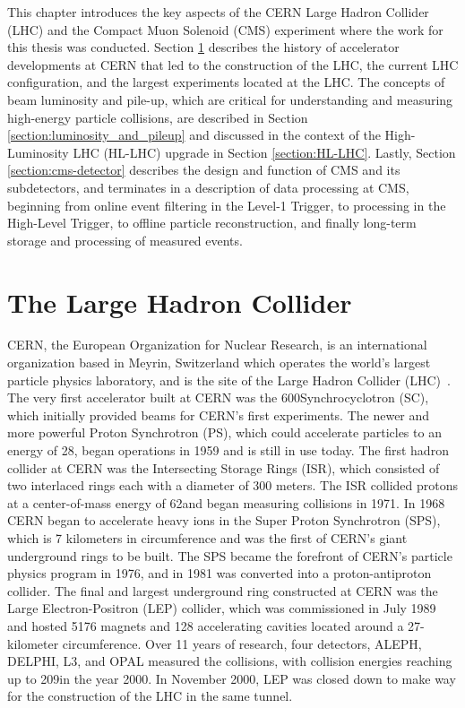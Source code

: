 This chapter introduces the key aspects of the CERN Large Hadron Collider (LHC) and the Compact Muon Solenoid (CMS) experiment where the work for this thesis was conducted. Section \ref{section:LHC} describes the history of accelerator developments at CERN that led to the construction of the LHC, the current LHC configuration, and the largest experiments located at the LHC. The concepts of beam luminosity and pile-up, which are critical for understanding and measuring high-energy particle collisions, are described in Section \ref{section:luminosity_and_pileup} and discussed in the context of the High-Luminosity LHC (HL-LHC) upgrade in Section \ref{section:HL-LHC}. Lastly, Section \ref{section:cms-detector} describes the design and function of CMS and its subdetectors, and terminates in a description of data processing at CMS, beginning from online event filtering in the Level-1 Trigger, to processing in the High-Level Trigger, to offline particle reconstruction, and finally long-term storage and processing of measured events.

\section{The Large Hadron Collider}
\label{section:LHC}
CERN, the European Organization for Nuclear Research, is an international organization based in Meyrin, Switzerland which operates the world's largest particle physics laboratory, and is the site of the Large Hadron Collider (LHC)~\cite{history_of_CERN}. The very first accelerator built at CERN was the 600\MeV Synchrocyclotron (SC), which initially provided beams for CERN's first experiments. The newer and more powerful Proton Synchrotron (PS), which could accelerate particles to an energy of 28\GeV, began operations in 1959 and is still in use today. The first hadron collider at CERN was the Intersecting Storage Rings (ISR), which consisted of two interlaced rings each with a diameter of 300 meters. The ISR collided protons at a center-of-mass energy of 62\GeV and began measuring collisions in 1971. In 1968 CERN began to accelerate heavy ions in the Super Proton Synchrotron (SPS), which is 7 kilometers in circumference and was the first of CERN's giant underground rings to be built. The SPS became the forefront of CERN's particle physics program in 1976, and in 1981 was converted into a proton-antiproton collider. The final and largest underground ring constructed at CERN was the Large Electron-Positron (LEP) collider, which was commissioned in July 1989 and hosted 5176 magnets and 128 accelerating cavities located around a 27-kilometer circumference. Over 11 years of research, four detectors, ALEPH, DELPHI, L3, and OPAL measured the collisions, with collision energies reaching up to 209\GeV in the year 2000. In November 2000, LEP was closed down to make way for the construction of the LHC in the same tunnel.

